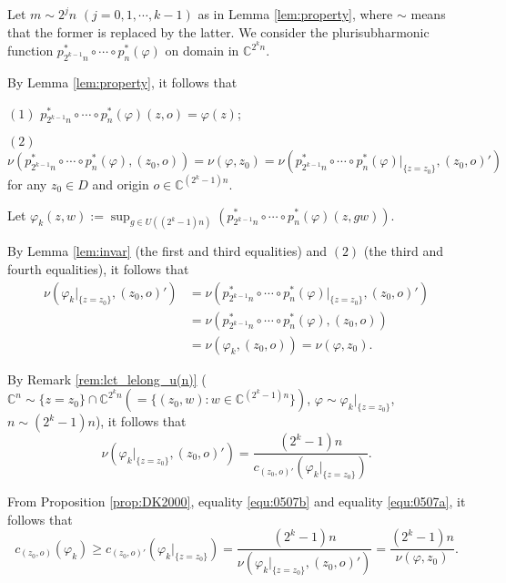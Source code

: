 \documentclass[reqno]{amsart}
\numberwithin{equation}{section}
\begin{document}
Let $m\sim 2^{j}n$ $(j=0,1,\cdots,k-1)$ as in Lemma \ref{lem:property},
where $\sim$ means that the former is replaced by the latter.
We consider the plurisubharmonic function
$p_{2^{k-1}n}^{*}\circ\cdots\circ p_{n}^{*}(\varphi)$ on domain in $\mathbb{C}^{2^{k}n}$.

By Lemma \ref{lem:property},
it follows that

$(1)$ $p_{2^{k-1}n}^{*}\circ\cdots\circ p_{n}^{*}(\varphi)(z,o)=\varphi(z)$;

$(2)$ $\nu(p_{2^{k-1}n}^{*}\circ\cdots\circ p_{n}^{*}(\varphi),(z_{0},o))=\nu(\varphi,z_{0})=\nu(p_{2^{k-1}n}^{*}\circ\cdots\circ p_{n}^{*}(\varphi)|_{\{z=z_{0}\}},(z_{0},o)')$
for any $z_{0}\in D$ and origin $o\in\mathbb{C}^{(2^{k}-1)n}$.

Let
$\varphi_{k}(z,w):=\sup_{g\in U((2^{k}-1)n)}(p_{2^{k-1}n}^{*}\circ\cdots\circ p_{n}^{*}(\varphi)(z,gw))$.

By Lemma \ref{lem:invar} (the first and third equalities) and $(2)$ (the third and fourth equalities),
it follows that
\begin{equation}
\label{equ:0507a}
\begin{split}
\nu({\varphi_{k}}|_{\{z=z_{0}\}},(z_{0},o)')
&=\nu(p_{2^{k-1}n}^{*}\circ\cdots\circ p_{n}^{*}(\varphi)|_{\{z=z_{0}\}},(z_{0},o)')
\\&=\nu(p_{2^{k-1}n}^{*}\circ\cdots\circ p_{n}^{*}(\varphi),(z_{0},o))
\\&=\nu(\varphi_{k},(z_{0},o))
=\nu(\varphi,z_{0}).
\end{split}
\end{equation}

By Remark \ref{rem:lct_lelong_u(n)} ($\mathbb{C}^{n}\sim\{z=z_{0}\}\cap\mathbb{C}^{2^{k}n}(=\{(z_{0},w):w\in\mathbb{C}^{(2^{k}-1)n}\})$, $\varphi\sim{\varphi_{k}}|_{\{z=z_{0}\}}$, $n\sim (2^{k}-1)n$),
it follows that
\begin{equation}
\label{equ:0507b}\nu({\varphi_{k}}|_{\{z=z_{0}\}},(z_{0},o)')=\frac{(2^{k}-1)n}{c_{(z_{0},o)'}({\varphi_{k}}|_{\{z=z_{0}\}})}.
\end{equation}

From Proposition \ref{prop:DK2000}, equality \ref{equ:0507b} and equality \ref{equ:0507a},
it follows that
\begin{equation}
\label{equ:0507c}c_{(z_{0},o)}({\varphi_{k}})\geq c_{(z_{0},o)'}({\varphi_{k}}|_{\{z=z_{0}\}})=\frac{(2^{k}-1)n}{\nu({\varphi_{k}}|_{\{z=z_{0}\}},(z_{0},o)')}
=\frac{(2^{k}-1)n}{\nu(\varphi,z_{0})}.
\end{equation}
\end{document}
